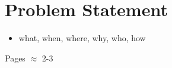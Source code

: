 \chapter{Problem Statement}
\label{cha:problemstatement}

\begin{itemize}
	\item what, when, where, why, who, how
\end{itemize}

Pages $\approx$ 2-3